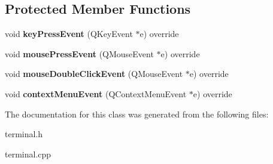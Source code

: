 \subsection*{Protected Member Functions}
\begin{DoxyCompactItemize}
\item 
\mbox{\label{class_terminal_aa6153d2187f1e8a1084e73e15fe6c5f8}} 
void {\bfseries key\+Press\+Event} (Q\+Key\+Event $\ast$e) override
\item 
\mbox{\label{class_terminal_aa7d4c50918e5f9b9f69c58eb782b8ecc}} 
void {\bfseries mouse\+Press\+Event} (Q\+Mouse\+Event $\ast$e) override
\item 
\mbox{\label{class_terminal_a3401e781f0158566d40f241aeb7a8448}} 
void {\bfseries mouse\+Double\+Click\+Event} (Q\+Mouse\+Event $\ast$e) override
\item 
\mbox{\label{class_terminal_a61663854bea3023be58380a19ca6e15d}} 
void {\bfseries context\+Menu\+Event} (Q\+Context\+Menu\+Event $\ast$e) override
\end{DoxyCompactItemize}


The documentation for this class was generated from the following files\+:\begin{DoxyCompactItemize}
\item 
terminal.\+h\item 
terminal.\+cpp\end{DoxyCompactItemize}
